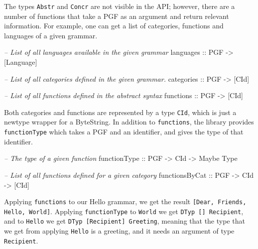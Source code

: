 \documentclass[]{article}
\newenvironment{Shaded}{\begin{snugshade}}{\end{snugshade}}
\newcommand{\DataTypeTok}[1]{\textcolor[rgb]{0.13,0.29,0.53}{{#1}}}
\newcommand{\CommentTok}[1]{\textcolor[rgb]{0.56,0.35,0.01}{\textit{{#1}}}}
\newcommand{\OtherTok}[1]{\textcolor[rgb]{0.56,0.35,0.01}{{#1}}}
\newcommand{\NormalTok}[1]{{#1}}
\begin{document}
The types \texttt{Abstr} and \texttt{Concr} are not visible in the API;
however, there are a number of functions that take a PGF as an argument
and return relevant information. For example, one can get a list of
categories, functions and languages of a given grammar.

\begin{Shaded}
\begin{Highlighting}[]
\CommentTok{-- List of all languages available in the given grammar}
\OtherTok{languages ::} \DataTypeTok{PGF} \OtherTok{->} \NormalTok{[}\DataTypeTok{Language}\NormalTok{]}

\CommentTok{-- List of all categories defined in the given grammar.}
\OtherTok{categories ::} \DataTypeTok{PGF} \OtherTok{->} \NormalTok{[}\DataTypeTok{CId}\NormalTok{]}

\CommentTok{-- List of all functions defined in the abstract syntax}
\OtherTok{functions ::} \DataTypeTok{PGF} \OtherTok{->} \NormalTok{[}\DataTypeTok{CId}\NormalTok{]}
\end{Highlighting}
\end{Shaded}

Both categories and functions are represented by a type \texttt{CId},
which is just a newtype wrapper for a ByteString. In addition to
\texttt{functions}, the library provides \texttt{functionType} which
takes a PGF and an identifier, and gives the type of that identifier.

\begin{Shaded}
\begin{Highlighting}[]
\CommentTok{-- The type of a given function}
\OtherTok{functionType ::} \DataTypeTok{PGF} \OtherTok{->} \DataTypeTok{CId} \OtherTok{->} \DataTypeTok{Maybe} \DataTypeTok{Type}

\CommentTok{-- List of all functions defined for a given category}
\OtherTok{functionsByCat ::} \DataTypeTok{PGF} \OtherTok{->} \DataTypeTok{CId} \OtherTok{->} \NormalTok{[}\DataTypeTok{CId}\NormalTok{]}
\end{Highlighting}
\end{Shaded}

Applying \texttt{functions} to our Hello grammar, we get the result
\texttt{{[}Dear, Friends, Hello, World{]}}. Applying \texttt{functionType}
to \texttt{World} we get \texttt{DTyp {[}{]} Recipient}, and to
\texttt{Hello} we get \texttt{DTyp {[}Recipient{]} Greeting}, meaning
that the type that we get from applying \texttt{Hello} is a greeting,
and it needs an argument of type \texttt{Recipient}.
\end{document}
